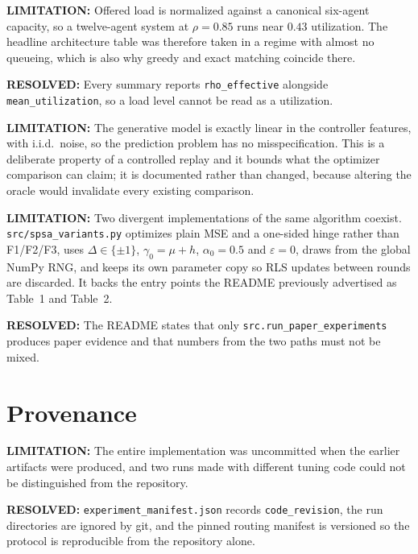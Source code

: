 \documentclass[11pt]{article}
\newcommand{\Warning}[1]{\par\noindent\textcolor{warning}{\textbf{LIMITATION:} #1}\par}
\newcommand{\Resolved}[1]{\par\noindent\textcolor{confirmed}{\textbf{RESOLVED:} #1}\par}
\begin{document}
\Warning{Offered load is normalized against a canonical six-agent capacity, so
a twelve-agent system at $\rho=0.85$ runs near $0.43$ utilization. The
headline architecture table was therefore taken in a regime with almost no
queueing, which is also why greedy and exact matching coincide there.}

\Resolved{Every summary reports \texttt{rho\_effective} alongside
\texttt{mean\_utilization}, so a load level cannot be read as a utilization.}

\Warning{The generative model is exactly linear in the controller features,
with i.i.d.\ noise, so the prediction problem has no misspecification. This is
a deliberate property of a controlled replay and it bounds what the optimizer
comparison can claim; it is documented rather than changed, because altering
the oracle would invalidate every existing comparison.}

\Warning{Two divergent implementations of the same algorithm coexist.
\texttt{src/spsa\_variants.py} optimizes plain MSE and a one-sided hinge rather
than F1/F2/F3, uses $\Delta\in\{\pm 1\}$, $\gamma_0=\mu+h$, $\alpha_0=0.5$ and
$\varepsilon=0$, draws from the global NumPy RNG, and keeps its own parameter
copy so RLS updates between rounds are discarded. It backs the entry points the
README previously advertised as Table~1 and Table~2.}

\Resolved{The README states that only \texttt{src.run\_paper\_experiments}
produces paper evidence and that numbers from the two paths must not be mixed.}

\section{Provenance}

\Warning{The entire implementation was uncommitted when the earlier artifacts
were produced, and two runs made with different tuning code could not be
distinguished from the repository.}

\Resolved{\texttt{experiment\_manifest.json} records
\texttt{code\_revision}, the run directories are ignored by git, and the pinned
routing manifest is versioned so the protocol is reproducible from the
repository alone.}
\end{document}
